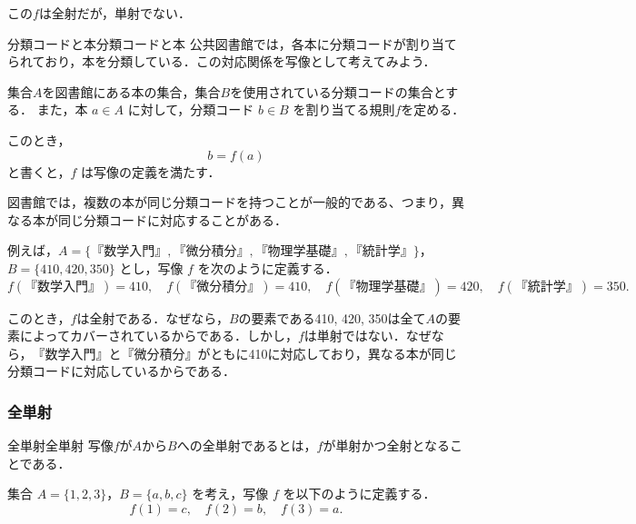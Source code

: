 \documentclass[a4paper,11pt]{ltjsarticle}
\begin{document}
この$f$は全射だが，単射でない．

\begin{example}{分類コードと本}{分類コードと本}
  公共図書館では，各本に分類コードが割り当てられており，本を分類している．この対応関係を写像として考えてみよう．

  集合$A$を図書館にある本の集合，集合$B$を使用されている分類コードの集合とする．
  また，本 $a \in A$ に対して，分類コード $b \in B$ を割り当てる規則$f$を定める．

  このとき，
  \[
  b = f(a)
  \]
  と書くと，$f$ は写像の定義を満たす．

  図書館では，複数の本が同じ分類コードを持つことが一般的である、つまり，異なる本が同じ分類コードに対応することがある．

  例えば，$A = \{\text{『数学入門』}, \text{『微分積分』}, \text{『物理学基礎』}, \text{『統計学』}\}$，
  $B = \{\text{410}, \text{420}, \text{350}\}$ とし，写像 $f$ を次のように定義する．
  \[
  f(\text{『数学入門』}) = 410, \quad 
  f(\text{『微分積分』}) = 410, \quad 
  f(\text{『物理学基礎』}) = 420, \quad 
  f(\text{『統計学』}) = 350.
  \]

  このとき，$f$は全射である．なぜなら，$B$の要素である410, 420, 350は全て$A$の要素によってカバーされているからである．しかし，$f$は単射ではない．なぜなら，$\text{『数学入門』}$と$\text{『微分積分』}$がともに410に対応しており，異なる本が同じ分類コードに対応しているからである．

\end{example}


\subsubsection{全単射}

\begin{definition}{全単射}{全単射}
写像$f$が$A$から$B$への全単射であるとは，$f$が単射かつ全射となることである．
\end{definition}

集合 $A = \{1, 2, 3\}$，$B = \{a, b, c\}$ を考え，写像 $f$ を以下のように定義する．
\[
f(1) = c, \quad f(2) = b, \quad f(3) = a.
\]
\end{document}
